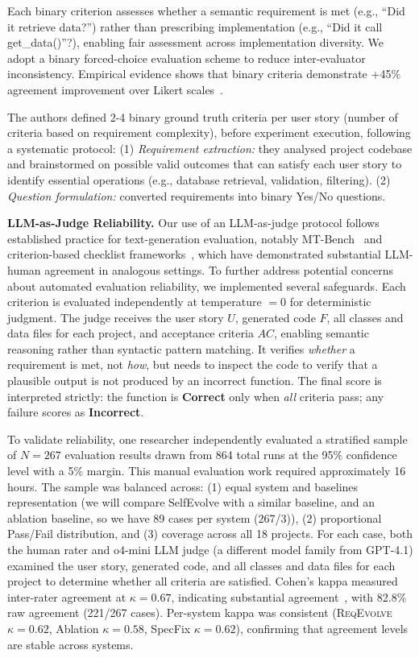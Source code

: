 \documentclass[sigconf,screen]{acmart}
\begin{document}
Each binary criterion assesses whether a semantic requirement is met (e.g., ``Did it retrieve data?'') rather than prescribing implementation (e.g., ``Did it call get\_data()''?), enabling fair assessment across implementation diversity.
We adopt a binary forced-choice evaluation scheme to reduce inter-evaluator inconsistency. Empirical evidence shows that binary criteria demonstrate +45\% agreement improvement over Likert scales~\cite{checkeval2025,zheng2023judging}.

The authors defined 2-4 binary ground truth criteria per user story (number of criteria based on requirement complexity), before experiment execution,  following a systematic protocol: (1) \textit{Requirement extraction:} they analysed project codebase and brainstormed on possible valid outcomes that can satisfy each user story to identify essential operations (e.g., database retrieval, validation, filtering). (2) \textit{Question formulation:} converted requirements into binary Yes/No questions.

\textbf{LLM-as-Judge Reliability.} Our use of an LLM-as-judge protocol follows established practice for text-generation evaluation, notably MT-Bench~\cite{zheng2023judging} and criterion-based checklist frameworks~\cite{checkeval2025}, which have demonstrated substantial LLM-human agreement in analogous settings. To further address potential concerns about automated evaluation reliability, we implemented several safeguards. Each criterion is evaluated independently at temperature $= 0$ for deterministic judgment. The judge receives the user story $U$, generated code $F$, all classes and data files for each project, and acceptance criteria $AC$, enabling semantic reasoning rather than syntactic pattern matching. It verifies \textit{whether} a requirement is met, not \textit{how}, but needs to inspect the code to verify that a plausible output is not produced by an incorrect function. The final score is interpreted strictly: the function is \textbf{Correct} only when \textit{all} criteria pass; any failure scores as \textbf{Incorrect}.

To validate reliability, one researcher independently evaluated a stratified sample of $N = 267$ evaluation results drawn from 864 total runs at the 95\% confidence level with a 5\% margin. This manual evaluation work required approximately 16 hours. The sample was balanced across: (1) equal system and baselines representation (we will compare SelfEvolve with a similar baseline, and an ablation baseline, so we have 89 cases per system (267/3)), (2) proportional Pass/Fail distribution, and (3) coverage across all 18 projects. For each case, both the human rater and o4-mini LLM judge (a different model family from GPT-4.1) examined the user story, generated code, and all classes and data files for each project to determine whether all criteria are satisfied. Cohen's kappa measured inter-rater agreement at $\kappa = 0.67$, indicating substantial agreement~\cite{landis1977measurement}, with 82.8\% raw agreement (221/267 cases). Per-system kappa was consistent (\textsc{ReqEvolve} $\kappa = 0.62$, Ablation $\kappa = 0.58$, SpecFix $\kappa = 0.62$), confirming that agreement levels are stable across systems.
\end{document}
